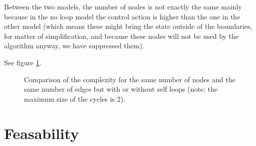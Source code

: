 Between the two models, the number of nodes is not exactly the same mainly because in the no loop model the control action is higher than the one in the other model (which means these might bring the state outside of the boundaries, for matter of simplification, and because these nodes will not be used by the algorithm anyway, we have suppressed them).

See figure \ref{fig:same_nbre_nodes}.

\datasamenode

\begin{figure}
\center
{}
\caption{Comparison of the complexity for the same number of nodes and the same number of edges but with or without self loops (note: the maximum size of the cycles is 2).}
\label{fig:same_nbre_nodes}
\end{figure}

\section{Feasability}
%
%


